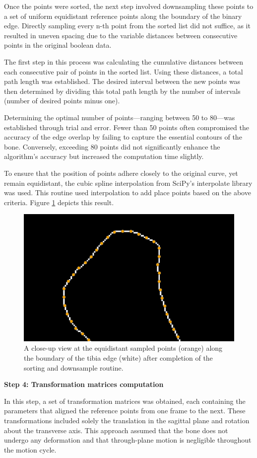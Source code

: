 \documentclass{micro-econ-thesis}
\begin{document}
Once the points were sorted, the next step involved downsampling these points to a set of uniform equidistant reference points along the boundary of the binary edge. Directly sampling every n-th point from the sorted list did not suffice, as it resulted in uneven spacing due to the variable distances between consecutive points in the original boolean data.

The first step in this process was calculating the cumulative distances between each consecutive pair of points in the sorted list. Using these distances, a total path length was established. The desired interval between the new points was then determined by dividing this total path length by the number of intervals (number of desired points minus one). 

Determining the optimal number of points—ranging between 50 to 80—was established through trial and error. Fewer than 50 points often compromised the accuracy of the edge overlap by failing to capture the essential contours of the bone. Conversely, exceeding 80 points did not significantly enhance the algorithm's accuracy but increased the computation time slightly. 

To ensure that the position of points adhere closely to the original curve, yet remain equidistant, the cubic spline interpolation from SciPy's interpolate library was used. This routine used interpolation to add place points based on the above criteria. 
Figure \ref{fig:downsampled} depicts this result. 
\begin{figure}[H]
	\centering
	\includegraphics[width=0.7\linewidth]{downsampled}
	\caption{A close-up view at the equidistant sampled points (orange) along the boundary of the tibia edge (white) after completion of the sorting and downsample routine. }
	\label{fig:downsampled}
\end{figure}

\textbf{Step 4: Transformation matrices computation}

In this step, a set of transformation matrices was obtained, each containing the parameters that aligned the reference points from one frame to the next. These transformations included solely the translation in the sagittal plane and rotation about the transverse axis. This approach assumed that the bone does not undergo any deformation and that through-plane motion is negligible throughout the motion cycle. 
\end{document}
